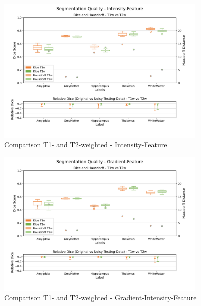 \documentclass[conference]{IEEEtran}
\begin{document}
\begin{appendices} \label{Appendix}

\listoffigures

\listoftables


\newpage


\begin{figure}[h!]
    \centering
    \includegraphics[width=0.9\textwidth, trim={0 15mm 0 10mm}, clip]{images/01_T1W_C_I_and_05_T2W_C_I.png}
      \caption{Comparison T1- and T2-weighted - Intensity-Feature}
    \label{fig:01_T1W_C_I_and_05_T2W_C_I}
\end{figure}
\begin{figure}[h!]
    \centering
    \includegraphics[width=0.9\textwidth, trim={0 15mm 0 10mm}, clip]{images/02_T1W_C_G_and_06_T2W_C_G.png}
      \caption{Comparison T1- and T2-weighted - Gradient-Intensity-Feature}
    \label{fig:02_T1W_C_G_and_06_T2W_C_G}
\end{figure}



\end{appendices}
\end{document}
